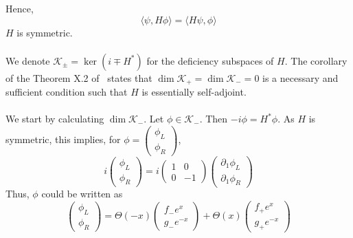 Hence, 
\begin{equation*}
\langle \psi, H \phi \rangle = \langle H \psi , \phi \rangle
\end{equation*}
$H$ is symmetric. 
\\\\
We denote  $\mathcal{K}_{\pm} = \ker (i \mp H^*)$ for the deficiency subspaces of $H$. 
The corollary of the Theorem X.2 of~\cite{Reed1975} states that $\dim \mathcal{K}_+ = \dim \mathcal{K}_- = 0$ is a necessary and sufficient condition such that $H$ is essentially self-adjoint. \\\\
We start by calculating $\dim\mathcal{K}_-$. Let $\phi \in \mathcal{K}_-$. Then $- i \phi = H^* \phi$. As $H$ is symmetric, this implies, for $\phi = \begin{pmatrix} \phi_L \\  \phi_R \end{pmatrix}$, 
\begin{equation}
i \begin{pmatrix} \phi_L \\ \phi_R \end{pmatrix} = 
i \begin{pmatrix} 1 & 0  \\ 0  &  -1 \end{pmatrix} 
\begin{pmatrix} \partial_1 \phi_L  \\  \partial_1\phi_R \end{pmatrix}
\end{equation} 
Thus, $\phi$ could be written as
\begin{equation}
\begin{pmatrix} \phi_L \\ \phi_R \end{pmatrix} = 
\Theta(-x) \begin{pmatrix} f_- e^x  \\ g_-  e^{-x} \end{pmatrix} + 
\Theta(x) \begin{pmatrix} f_+ e^x  \\ g_+  e^{-x} \end{pmatrix}
\end{equation}
